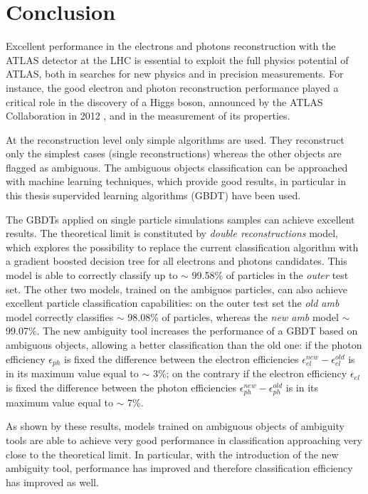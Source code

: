 \documentclass[a4paper, oneside]{book}
\begin{document}
	\chapter*{Conclusion}
		Excellent performance in the electrons and photons reconstruction with the ATLAS detector at the LHC is essential to exploit the full physics potential of ATLAS, both in searches for new physics and in precision measurements. For instance, the good electron and photon reconstruction performance played a critical role in the discovery of a Higgs boson, announced by the ATLAS Collaboration in 2012 \cite{Higgs}, and in the measurement of its properties.
		
		At the reconstruction level only simple algorithms are used. They reconstruct only the simplest cases (single reconstructions) whereas the other objects are flagged as ambiguous. The ambiguous objects classification can be approached with machine learning techniques, which provide good results, in particular in this thesis supervided learning algorithms (GBDT) have been used.
		
		The GBDTs applied on single particle simulations samples can achieve excellent results. The theoretical limit is constituted by \textit{double reconstructions} model, which explores the possibility to replace the current classification algorithm with a gradient boosted decision tree for all electrons and photons candidates. This model is able to correctly classify up to $\sim$ 99.58\% of particles in the \textit{outer} test set. The other two models, trained on the ambiguos particles, can also achieve excellent particle classification capabilities: on the outer test set the \textit{old amb} model correctly classifies $\sim$ 98.08\% of particles, whereas the \textit{new amb} model $\sim$ 99.07\%. The new ambiguity tool  increases the performance of a GBDT based on ambiguous objects, allowing a better classification than the old one: if the photon efficiency $\epsilon_{ph}$ is fixed the difference between the electron efficiencies $\epsilon_{el}^{new} - \epsilon_{el}^{old}$ is in its maximum value equal to $\sim$ 3\%; on the contrary if the electron efficiency $\epsilon_{el}$ is fixed the difference between the photon efficiencies $\epsilon_{ph}^{new} - \epsilon_{ph}^{old}$ is in its maximum value equal to $\sim$ 7\%.
		
		As shown by these results, models trained on ambiguous objects of ambiguity tools are able to achieve very good performance in classification approaching very close to the theoretical limit. In particular, with the introduction of the new ambiguity tool, performance has improved and therefore classification efficiency has improved as well.
		
\end{document}
